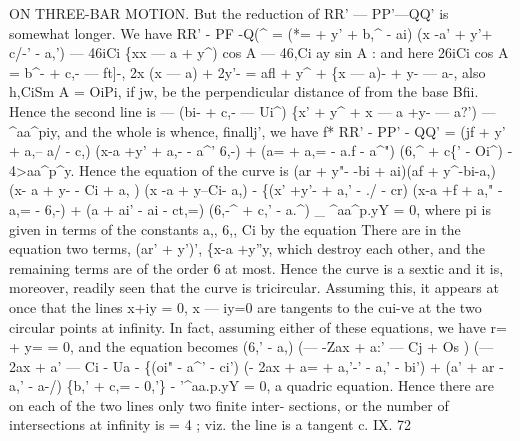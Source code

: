 \documentclass[12pt,a4paper]{article}
\begin{document}
ON THREE-BAR MOTION.
But the reduction
of RR' --- PP'---QQ'
is somewhat
longer.
We have
RR' - PF -Q(\textasciicircum{} = (*\textbullet{}= + y' + b,\textasciicircum{} - ai) (x -a' + y'+
c/-' - a,')
--- 46iCi \{xx --- a + y\textasciicircum{}) cos A --- 46,Ci ay sin A
:
and here
26iCi cos A = b\textasciicircum{}- + c,- --- ft]-,
2x (x --- a) + 2y'- = afl + y\textasciicircum{} + \{x --- a)- + y- --- a-,
also
h,CiSm A = OiPi,
if
jw,
be
the
perpendicular
distance
of
from
the
base
Bfii.
Hence the second
line
is
--- (bi- + c,- --- Ui\textasciicircum{}) \{x' + y\textasciicircum{} + x --- a +y- --- a?') --- \textasciicircum{}aa\textasciicircum{}piy,
and the whole
is
whence,
finallj', we have
f*
RR' - PP' - QQ' = (jf + y' + a,-- a/ - c,\guillemotright{}) (x-a +y' + a,- - a\textasciicircum{}'
6,-)
+ (a= + a,= - a.f - a\textasciicircum{}") (6,\textasciicircum{} + c\{' - Oi\textasciicircum{}) - 4>aa\textasciicircum{}p\textasciicircum{}y.
Hence the equation of the curve
is
(ar + y"- -bi + ai)(af + y\textasciicircum{}-bi-a,)(x- a + y- - Ci + a, ) (x -a + y--Ci- a,)
- \{(x' +y'- + a,' - \guillemotleft{}./ - cr) (x-a +f + a," - a,= - 6,-)
+ (a\guillemotright{} + ai' - ai - ct,=) (6,-\textasciicircum{} + c,' - a.\textasciicircum{}) \_ \textasciicircum{}aa\textasciicircum{}p.yY = 0,
where pi
is given
in terms of the constants
a,,
6,,
Ci by
the equation
There
are
in
the
equation
two
terms,
(ar' + y')', \{x-a +y''y, which
destroy each
other,
and
the
remaining
terms
are
of
the
order
6
at
most.
Hence
the
curve
is
a
sextic
and
it
is,
moreover,
readily
seen
that
the
curve
is
tricircular.
Assuming
this,
it
appears
at
once
that
the
lines x+iy = 0, x --- iy=0
are
tangents
to
the
cui-ve
at the
two
circular
points
at
infinity.
In
fact, assuming
either
of
these
equations,
we
have
r= + y= = 0, and the equation becomes
(6,' - a,\guillemotright{}) (--- -Zax + a:' --- Cj + Os ) (--- 2ax + a' --- Ci - Ua
- \{(oi" - a\textasciicircum{}' - ci') (- 2ax + a= + a,'-' - a,' - bi')
+ (a' + ar - a,' - a-/) \{b,' + c,= - 0,'\} - '\textasciicircum{}aa.p.yY = 0,
a
quadric
equation.
Hence
there
are
on
each
of
the
two
lines
only two
finite
inter-
sections, or
the
number
of
intersections
at
infinity
is = 4 ;
viz.
the
line
is
a
tangent
c. IX.
72
\end{document}
